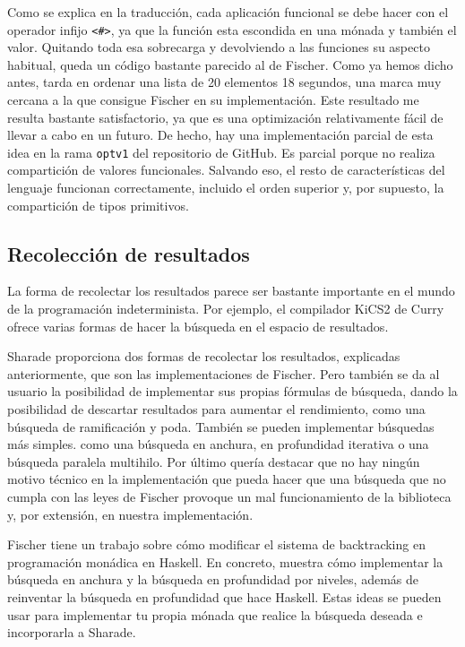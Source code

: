 \documentclass[class=article, crop=false]{standalone}
\begin{document}
Como se explica en la traducción, cada aplicación funcional se debe hacer con el operador
infijo \verb`<#>`, ya que la función esta escondida en una mónada y también el valor.
Quitando toda esa sobrecarga y devolviendo a las funciones su aspecto habitual, queda un
código bastante parecido al de Fischer. Como ya hemos dicho antes, tarda en ordenar una lista
de 20 elementos 18 segundos, una marca muy cercana a la que consigue Fischer en su
implementación. Este resultado me resulta bastante satisfactorio, ya que es una optimización
relativamente fácil de llevar a cabo en un futuro. De hecho, hay una implementación parcial
de esta idea en la rama \verb`optv1` del repositorio de GitHub. Es parcial porque no realiza
compartición de valores funcionales. Salvando eso, el resto de características del lenguaje
funcionan correctamente, incluido el orden superior y, por supuesto, la compartición de tipos
primitivos.

\subsection{Recolección de resultados}

La forma de recolectar los resultados parece ser bastante importante en el mundo de la
programación indeterminista. Por ejemplo, el compilador KiCS2 de Curry ofrece varias formas
de hacer la búsqueda en el espacio de resultados\cite{hanus2012search}.

Sharade proporciona dos formas de recolectar los resultados, explicadas anteriormente,
que son las implementaciones de Fischer. Pero también se da al usuario la posibilidad de
implementar sus propias fórmulas de búsqueda, dando la posibilidad de descartar resultados
para aumentar el rendimiento, como una búsqueda de ramificación y poda. También se pueden
implementar búsquedas más simples. como una búsqueda en anchura, en profundidad iterativa o
una búsqueda paralela multihilo. Por último quería destacar que no hay ningún motivo técnico
en la implementación que pueda hacer que una búsqueda que no cumpla con las leyes de Fischer
provoque un mal funcionamiento de la biblioteca y, por extensión, en nuestra implementación.

Fischer tiene un trabajo\cite{fischer2009reinventing} sobre cómo modificar el sistema de
backtracking en programación monádica en Haskell. En concreto, muestra cómo implementar la
búsqueda en anchura y la búsqueda en profundidad por niveles, además de reinventar la
búsqueda en profundidad que hace Haskell. Estas ideas se pueden usar para implementar tu
propia mónada que realice la búsqueda deseada e incorporarla a Sharade.
\end{document}
